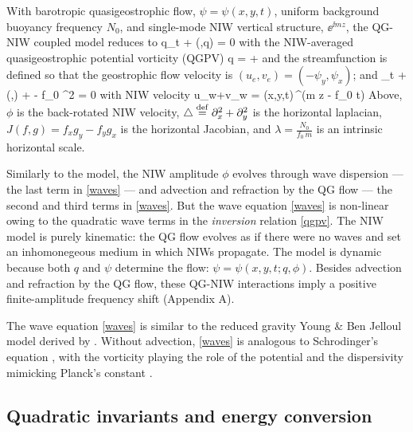 \documentclass{jfm}
\begin{document}
With barotropic quasigeostrophic flow, $\psi=\psi(x,y,t)$,
uniform background buoyancy frequency $N_0$, and
single-mode NIW vertical structure, $\ee^{\ii m z}$, the \cite{xie_vanneste2015}
QG-NIW coupled model reduces to
\beq
\label{macroturb}
q_t + \sJ(\psi,q) = 0\com
\eeq
with the NIW-averaged quasigeostrophic potential vorticity (QGPV)
\beq
\label{qgpv}
q = \lap \psi +
                 \com
\eeq
and the streamfunction is defined so that the geostrophic flow velocity is
$(u_e, v_e) = (-\psi_y, \psi_x)$; and
\beq
\label{waves}
\phi_t + \sJ(\psi,\phi) + \phi\lap \psi -  f_0 \lambda^2 \lap \phi
 = 0\com
\eeq
with NIW velocity
\beq
\label{niw_velocity}
u_w+\ii v_w  = \phi(x,y,t)\,\ee^{\ii (m z - f_0 t)}\per
\eeq
Above,
$\phi$ is the back-rotated NIW
velocity, $\triangle \stackrel{\mathrm{def}}{=} \partial_x^2 + \partial_y^2$ is the horizontal laplacian,
$J(f,g)=f_x g_y - f_y g_x$ is the horizontal Jacobian, and
$\lambda = \tfrac{N_0}{f_0\, m}$  is an intrinsic horizontal scale.

Similarly to the \cite{young_benjelloul1997} model, the NIW amplitude $\phi$
evolves through wave dispersion --- the last term in \eqref{waves} --- and
advection and refraction by the QG flow --- the second and third terms in
\eqref{waves}. But the wave equation \eqref{waves} is non-linear owing to the
quadratic wave terms in the \textit{inversion} relation \eqref{qgpv}. The
\cite{young_benjelloul1997} NIW model is purely kinematic: the QG flow evolves as
if there were no waves and set an inhomonegeous medium in which NIWs propagate.
The \cite{xie_vanneste2015} model is dynamic because both $q$ and $\psi$
determine the flow: $\psi=\psi(x,y,t; q, \phi)$. Besides advection and refraction
by the QG flow, these QG-NIW interactions imply a positive finite-amplitude
frequency shift (Appendix A).

The wave equation \eqref{waves} is similar to the reduced gravity
Young \& Ben Jelloul model derived by  \cite{danioux_etal2015}. Without advection,
\eqref{waves} is analogous to Schrodinger's equation
\citep[e.g.,][ pg. 51]{landau_lifshitz2013}, with the vorticity playing the role
of the
potential and the dispersivity mimicking Planck's constant
\citep{danioux_etal2015}.

\subsection{Quadratic invariants and energy conversion}
\end{document}
